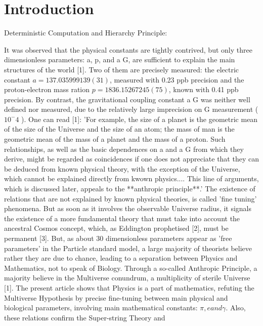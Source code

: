 
\chapter{Introduction}

Deterministic Computation and Hierarchy Principle:
\begin{center}
It was observed that the physical constants are tightly contrived, but only three dimensionless
parameters: a, p, and a G, are sufficient to explain the main structures of the world [1]. Two of them
are precisely measured: the electric constant $a = 137.035999139(31)$, measured with 0.23 ppb
precision and the proton-electron mass ration $p = 1836.15267245(75)$, known with 0.41 ppb
precision. By contrast, the gravitational coupling constant a G was neither well defined nor
measured, due to the relatively large imprecision on G measurement ($10^-4$ ).
One can read [1]: 'For example, the size of a planet is the geometric mean of the size of the
Universe and the size of an atom; the mass of man is the geometric mean of the mass of a planet
and the mass of a proton. Such relationships, as well as the basic dependences on a and a G from
which they derive, might be regarded as coincidences if one does not appreciate that they can be
deduced from known physical theory, with the exception of the Universe, which cannot be explained
directly from kwown physics.... This line of arguments, which is discussed later, appeals to the
**anthropic principle**.'
The existence of relations that are not explained by known physical theories, is called 'fine
tuning' phenomena. But as soon as it involves the observable Universe radius, it signals the
existence of a more fundamental theory that must take into account the ancestral Cosmos concept,
which, as Eddington prophetised [2], must be permanent [3].
But, as about 30 dimensionless parameters appear as 'free parameters' in the Particle standard
model, a large majority of theorists believe rather they are due to chance, leading to a separation
between Physics and Mathematics, not to speak of Biology. Through a so-called Anthropic
Principle, a majority believe in the Multiverse conundrum, a multiplicity of sterile Universe [1].
The present article shows that Physics is a part of mathematics, refuting the Multiverse
Hypothesis by precise fine-tuning between main physical and biological parameters, involving
main mathematical constants: $\pi, e and \gamma $. Also, these relations confirm the Super-string Theory and

\end{center}
